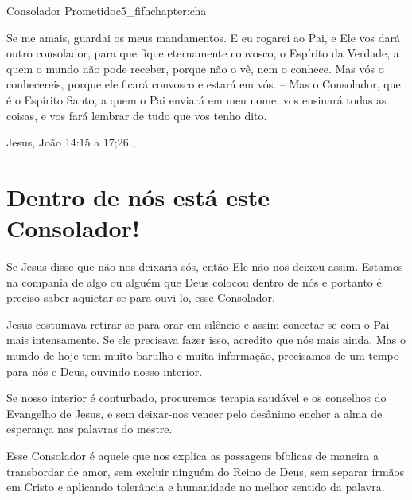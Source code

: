 \begin{chapterpage}{Consolador Prometido}{c5_fifhchapter:cha}

\begin{myquotation} Se me amais, guardai os meus mandamentos. E eu rogarei ao Pai, e Ele vos dará outro consolador, para que fique eternamente convosco, o Espírito da Verdade, a quem o mundo não pode receber, porque não o vê, nem o conhece. Mas vós o conhecereis, porque ele ficará convosco e estará em vós. -- Mas o Consolador, que é o Espírito Santo, a quem o Pai enviará em meu nome, vos ensinará todas as coisas, e vos fará lembrar de tudo que vos tenho dito. 
\par\vspace*{15mm}
\mbox{}\hfill \emdash{}Jesus, João 14:15 a 17;26 
, %
\par\end{myquotation}

\end{chapterpage}



\section{Dentro de nós está este Consolador!}\label{c1_basicformatting:sec}

\emdash{}Se Jesus disse que não nos deixaria sós, então Ele não nos deixou assim. Estamos na compania de algo ou alguém que Deus colocou dentro de nós e portanto é preciso saber aquietar-se para ouvi-lo, esse Consolador.

\emdash{}Jesus costumava retirar-se para orar em silêncio e assim conectar-se com o Pai mais intensamente. Se ele precisava fazer isso, acredito que nós mais ainda. Mas o mundo de hoje tem muito barulho e muita informação, precisamos de um tempo para nós e Deus, ouvindo nosso interior.

\emdash{}Se nosso interior é conturbado, procuremos terapia saudável e os conselhos do Evangelho de Jesus, e sem deixar-nos vencer pelo desânimo encher a alma de esperança nas palavras do mestre.

\emdash{}Esse Consolador é aquele que nos explica as passagens bíblicas de maneira a transbordar de amor, sem excluir ninguém do Reino de Deus, sem separar irmãos em Cristo e aplicando tolerância e humanidade no melhor sentido da palavra.

